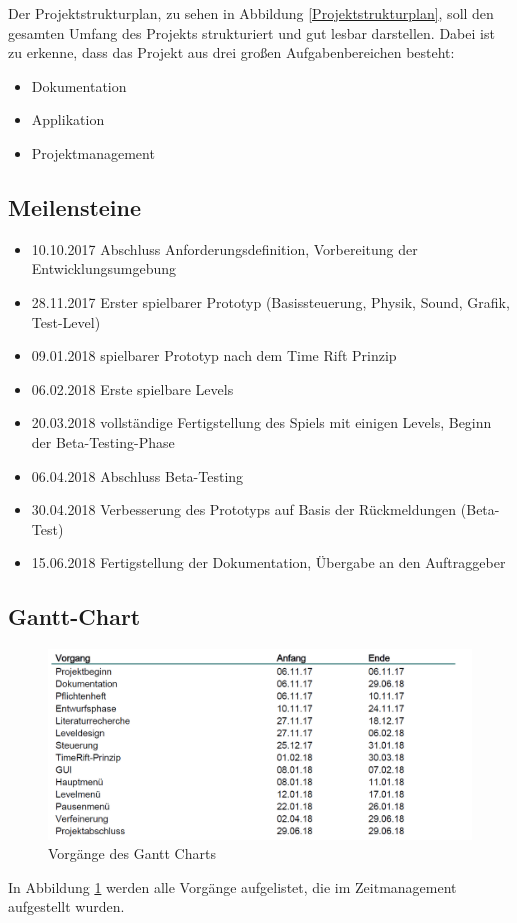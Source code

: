 Der Projektstrukturplan, zu sehen in Abbildung \ref{Projektstrukturplan}, soll den gesamten Umfang des Projekts strukturiert und gut lesbar darstellen. Dabei ist zu erkenne, dass das Projekt aus drei großen Aufgabenbereichen besteht:
\begin{itemize}
	\item Dokumentation
	\item Applikation
	\item Projektmanagement
\end{itemize}
\def \currentAuthor {Lukas Vogel}
\newpage

\subsection{Meilensteine}
\def \currentAuthor {Michael Leitner}
\begin{itemize}
	\item 10.10.2017 Abschluss Anforderungsdefinition, Vorbereitung der Entwicklungsumgebung	
	\item 28.11.2017 Erster spielbarer Prototyp (Basissteuerung, Physik, Sound, Grafik, Test-Level)	
	\item 09.01.2018 spielbarer Prototyp nach dem Time Rift Prinzip	
	\item 06.02.2018 Erste spielbare Levels	
	\item 20.03.2018 vollständige Fertigstellung des Spiels mit einigen Levels, Beginn der Beta-Testing-Phase	
	\item 06.04.2018 Abschluss Beta-Testing	
	\item 30.04.2018 Verbesserung des Prototyps auf Basis der Rückmeldungen (Beta-Test)
	\item 15.06.2018 Fertigstellung der Dokumentation, Übergabe an den Auftraggeber
\end{itemize}
\subsection{Gantt-Chart}
\begin{figure}[H]
	\centering
	\includegraphics[width=15cm]{images/Vorgaenge.png}
	\caption{Vorgänge des Gantt Charts}	
	\label{Gantt-Auflistung}	
\end{figure}
In Abbildung \ref{Gantt-Auflistung} werden alle Vorgänge aufgelistet, die im Zeitmanagement aufgestellt wurden.

